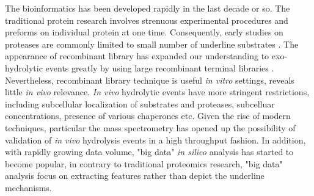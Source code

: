 The bioinformatics has been developed rapidly in the last decade or so. The traditional protein research involves strenuous experimental procedures and preforms on individual protein at one time. Consequently, early studies on proteases are commonly limited to small number of underline substrates \cite{:1992aa}. The appearance of recombinant library has expanded our understanding to exo-hydrolytic events greatly by using large recombinant terminal libraries \cite{Gupta:2010aa}. Nevertheless, recombinant library technique is useful \textit{in vitro} settings, reveals little \textit{in vivo} relevance. \textit{In vivo} hydrolytic events have more stringent restrictions, including subcellular localization of substrates and proteases, subcelluar concentrations, presence of various chaperones etc. Given the rise of modern techniques, particular the mass spectrometry has opened up the possibility of validation of \textit{in vivo} hydrolysis events in a high throughput fashion. In addition, with rapidly growing data volume, "big data" \textit{in silico} analysis has started to become popular, in contrary to traditional proteomics research, "big data" analysis focus on extracting features rather than depict the underline mechanisms. 